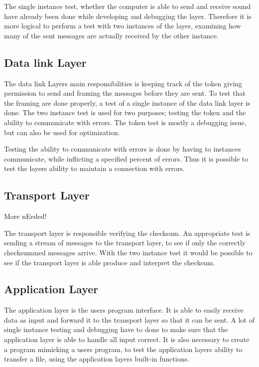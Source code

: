 The single instance test, whether the computer is able to send and receive sound have already been done while developing and debugging the layer. Therefore it is more logical to perform a test with two instances of the layer, examining how many of the sent messages are actually received by the other instance.

\subsection{Data link Layer}


The data link Layers main responsibilities is keeping track of the token giving permission to send and framing the messages before they are sent.
To test that the framing are done properly, a test of a single instance of the data link layer is done. The two instance test is used for two purposes; testing the token and the ability to communicate with errors. The token test is mostly a debugging issue, but can also be used for optimization.

Testing the ability to communicate with errors is done by having to instances communicate, while inflicting a specified percent of errors. Thus it is possible to test the layers ability to maintain a connection with errors.


\subsection{Transport Layer}

More nEeded!

The transport layer is responsible verifying the checksum. An appropriate test is sending a stream of messages to the transport layer, to see if only the correctly checksummed messages arrive. With the two instance test it would be possible to see if the transport layer is able produce and interpret the checksum.

\subsection{Application Layer}

The application layer is the users program interface. It is able to easily receive data as input and forward it to the transport layer so that it can be sent. A lot of single instance testing and debugging have to done to make sure that the application layer is able to handle all input correct. It is also necessary to create a program mimicking a users program, to test the application layers ability to transfer a file, using the application layers built-in functions. 

